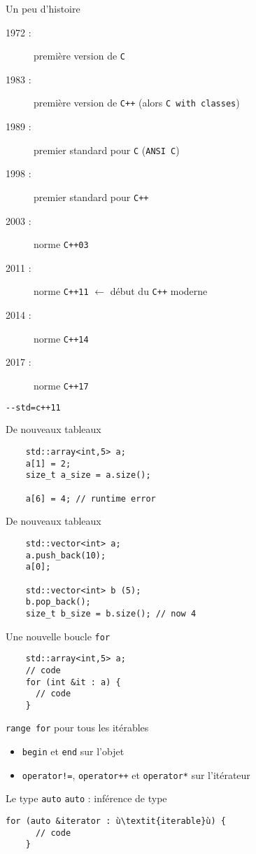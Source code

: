 
\begin{frame}[fragile]{Un peu d'histoire}
  \begin{description}
  \item[1972 :] première version de \texttt{C}
  \item[1983 :] première version de \texttt{C++} (alors \texttt{C with classes})
  \item[1989 :] premier standard pour \texttt{C} (\texttt{ANSI C})
  \item[1998 :] premier standard pour \texttt{C++}
  \item[2003 :] norme \texttt{C++03}
  \item[2011 :] norme \texttt{C++11} $\leftarrow$ début du \texttt{C++} moderne
  \item[2014 :] norme \texttt{C++14}
  \item[2017 :] norme \texttt{C++17}
  \end{description}
  \begin{lstlisting}[language=bash]
    --std=c++11
  \end{lstlisting}
\end{frame}

\begin{frame}[fragile]{De nouveaux tableaux}
  \begin{lstlisting}
    std::array<int,5> a;
    a[1] = 2;
    size_t a_size = a.size();

    a[6] = 4; // runtime error
  \end{lstlisting}
\end{frame}

\begin{frame}[fragile]{De nouveaux tableaux}
  \begin{lstlisting}
    std::vector<int> a;
    a.push_back(10);
    a[0];

    std::vector<int> b (5);
    b.pop_back();
    size_t b_size = b.size(); // now 4
  \end{lstlisting}
\end{frame}

\begin{frame}[fragile]{Une nouvelle boucle \texttt{for}}
  \begin{lstlisting}
    std::array<int,5> a;
    // code
    for (int &it : a) {
      // code
    }
  \end{lstlisting}
  \texttt{range for} pour tous les itérables
  \begin{itemize}
  \item \texttt{begin} et \texttt{end} sur l'objet
  \item \texttt{operator!=}, \texttt{operator++} et \texttt{operator*} sur l'itérateur
  \end{itemize}
\end{frame}

\begin{frame}[fragile]{Le type \texttt{auto}}
  \texttt{auto} : inférence de type
  
  \begin{lstlisting}[escapechar=ù]
    for (auto &iterator : ù\textit{iterable}ù) {
      // code
    }
  \end{lstlisting}
\end{frame}